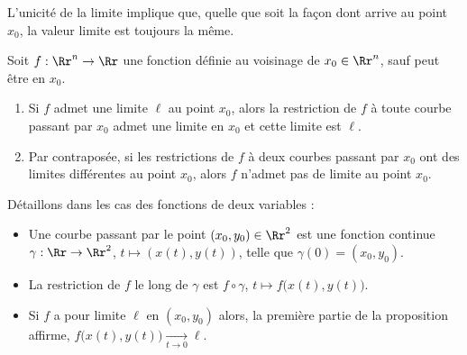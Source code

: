 \documentclass[12pt, class=report,crop=false]{standalone}
\begin{document}
L'unicité de la limite implique que, quelle que soit la façon dont arrive au point $x_0$, la valeur limite est toujours la même.

\begin{proposition} Soit $f:\Rr^n\to \Rr$ une fonction définie au voisinage de $x_0 \in \Rr^n$, sauf peut être en $x_0$.
\begin{enumerate}
\item Si $f$ admet une limite $\ell$ au point $x_0$, alors la restriction de $f$ à toute courbe passant par $x_0$ admet une limite en $x_0$ et cette limite est $\ell$. 
\item Par contraposée, si les restrictions de $f$ à deux courbes passant par $x_0$ ont des limites différentes au point $x_0$, alors $f$ n'admet pas de limite au point $x_0$.
\end{enumerate}
\end{proposition}

Détaillons dans les cas des fonctions de deux variables :
\begin{itemize}
  \item Une courbe passant par le point $(x_0,y_0) \in \Rr^2$ est une fonction continue 
$\gamma : \Rr \to \Rr^2$, $t \mapsto (x(t),y(t))$, telle que $\gamma(0) = (x_0,y_0)$.
  \item La restriction de $f$ le long de $\gamma$ est $f \circ \gamma$, $t \mapsto f \big( x(t),y(t) \big)$.
  \item Si $f$ a pour limite $\ell$ en $(x_0,y_0)$ alors, la première partie de la proposition affirme, 
  $f \big( x(t),y(t) \big) \underset{t \to 0}{\longrightarrow} \ell$.
\end{itemize}

\end{document}
